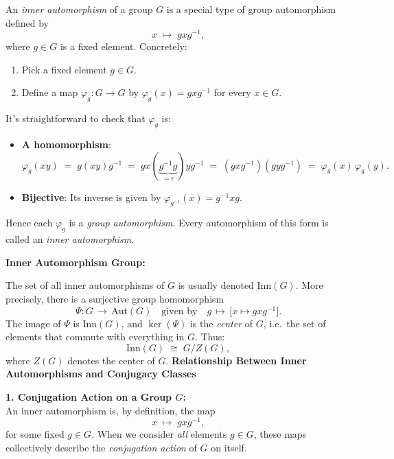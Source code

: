 \documentclass[12pt]{article}
\theoremstyle{definition} %
\theoremstyle{plain} %
\begin{document}
\bigskip

\noindent
An \emph{inner automorphism} of a group $G$ is a special type of group automorphism defined by 
\[
x \;\mapsto\; gxg^{-1},
\]
where $g \in G$ is a fixed element. Concretely:

\begin{enumerate}
    \item Pick a fixed element $g \in G$.
    \item Define a map $\varphi_g: G \to G$ by $\varphi_g(x) = gxg^{-1}$ for every $x \in G$.
\end{enumerate}

\noindent
It's straightforward to check that $\varphi_g$ is:
\begin{itemize}
    \item \textbf{A homomorphism}:
    \[
    \varphi_g(xy) \;=\; g(xy)g^{-1} \;=\; gx(\underbrace{g^{-1}g}_{=e})yg^{-1} \;=\; (gxg^{-1})(gyg^{-1}) \;=\; \varphi_g(x)\,\varphi_g(y).
    \]
    \item \textbf{Bijective}: Its inverse is given by $\varphi_{g^{-1}}(x) = g^{-1}xg$.  
\end{itemize}

\medskip

\noindent
Hence each $\varphi_g$ is a \emph{group automorphism}. Every automorphism of this form is called an \emph{inner automorphism}.

\bigskip

\noindent
\textbf{Inner Automorphism Group:}

\noindent
The set of all inner automorphisms of $G$ is usually denoted $\mathrm{Inn}(G)$. More precisely, there is a surjective group homomorphism
\[
\Psi : G \,\longrightarrow\, \mathrm{Aut}(G)
\quad\text{given by}\quad
g \,\mapsto\, \bigl[x \mapsto gxg^{-1}\bigr].
\]
The image of $\Psi$ is $\mathrm{Inn}(G)$, and $\ker(\Psi)$ is the \emph{center} of $G$, i.e.\ the set of elements that commute with everything in $G$. Thus:
\[
\mathrm{Inn}(G) \;\cong\; G / Z(G),
\]
where $Z(G)$ denotes the center of $G$.
\noindent
\textbf{Relationship Between Inner Automorphisms and Conjugacy Classes}

\bigskip

\noindent
\textbf{1. Conjugation Action on a Group $G$:}\\
An inner automorphism is, by definition, the map
\[
x \;\mapsto\; g x g^{-1},
\]
for some fixed \(g \in G\).  When we consider \emph{all} elements \(g \in G\), these maps collectively describe the \emph{conjugation action} of \(G\) on itself.
\end{document}
